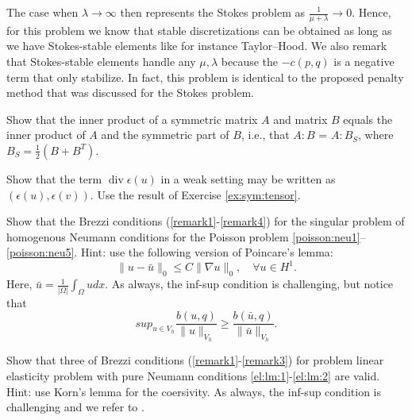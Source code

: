 The case when $\lambda\rightarrow\infty$ then represents the Stokes
problem as $\frac{1}{\mu + \lambda}\rightarrow 0$. Hence, for this
problem we know that stable discretizations can be obtained
as long as we have Stokes-stable elements like for instance Taylor--Hood.
We also remark that Stokes-stable elements handle any $\mu, \lambda$
because the $-c(p,q)$ is a negative term that only stabilize.
In fact, this problem is identical to the proposed penalty
method that was discussed for the Stokes problem. 



\begin{exercise}
\label{ex:sym:tensor}
Show that the inner product of a symmetric matrix $A$ and matrix $B$ equals
the inner product of $A$ and the symmetric part of $B$, i.e., that
$A:B$ = $A:B_S$, where $B_S = \frac{1}{2} (B + B^T)$. 
\end{exercise}

\begin{exercise}
Show that the term $\operatorname{div} \epsilon(u)$ in a weak setting may be written as $(\epsilon(u), \epsilon(v))$. Use the result of Exercise \ref{ex:sym:tensor}.   
\end{exercise}

\begin{exercise}
\label{ex:poissonbrezzi}
Show that the Brezzi conditions (\ref{remark1}-\ref{remark4}) for the singular problem of homogenous Neumann conditions for the Poisson problem \eqref{poisson:neu1}--\eqref{poisson:neu5}. Hint: use the following version of Poincare's lemma: 
\[
\|u-\bar{u}\|_0 \le C \|\nabla u \|_0, \quad \forall u \in H^1 .  
\]
Here, $\bar{u}=\frac{1}{|\Omega|}\int_\Omega u dx$. 
As always, the inf-sup condition is challenging, but notice that
\[
sup_{u\in V_h} \frac{b(u,q)}{\|u\|_{V_h}} \ge \frac{b(\bar{u},q)}{\|\bar{u}\|_{V_h}} .  
\]
\end{exercise}



\begin{exercise}
\label{ex:kornbrezzi}
Show that three of Brezzi conditions (\ref{remark1}-\ref{remark3}) for problem linear elasticity problem with pure Neumann conditions \eqref{el:lm:1}-\eqref{el:lm:2} are valid. Hint: use Korn's lemma for the coersivity.
As always, the inf-sup condition is challenging and we refer to \cite{kuchta2019singular}.
\end{exercise}

